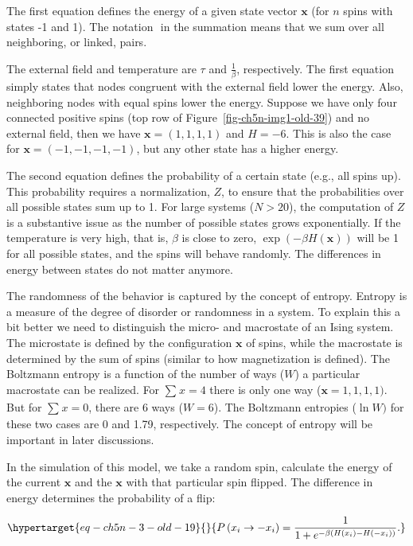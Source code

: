 \documentclass[
  a4paper,
  DIV=11,
  numbers=noendperiod]{scrreprt}
\begin{document}
The first equation defines the energy of a given state vector
\(\mathbf{x}\) (for \(n\) spins with states -1 and 1). The notation
\(< i,j >\) in the summation means that we sum over all neighboring, or
linked, pairs.

The external field and temperature are \(\tau\) and \(\frac{1}{\beta}\),
respectively. The first equation simply states that nodes congruent with
the external field lower the energy. Also, neighboring nodes with equal
spins lower the energy. Suppose we have only four connected positive
spins (top row of Figure~\ref{fig-ch5n-img1-old-39}) and no external
field, then we have \(\mathbf{x} = (1,1,1,1)\) and \(H = - 6\). This is
also the case for \(\mathbf{x} = ( - 1, - 1, - 1, - 1)\), but any other
state has a higher energy.

The second equation defines the probability of a certain state (e.g.,
all spins up). This probability requires a normalization, \(Z\), to
ensure that the probabilities over all possible states sum up to 1. For
large systems (\(N > 20\)), the computation of \(Z\) is a substantive
issue as the number of possible states grows exponentially. If the
temperature is very high, that is, \(\beta\) is close to zero,
\(\exp\left( - \beta H\left( \mathbf{x} \right) \right)\) will be 1 for
all possible states, and the spins will behave randomly. The differences
in energy between states do not matter anymore.

The randomness of the behavior is captured by the concept of entropy.
Entropy is a measure of the degree of disorder or randomness in a
system. To explain this a bit better we need to distinguish the micro-
and macrostate of an Ising system. The microstate is defined by the
configuration \(\mathbf{x}\) of spins, while the macrostate is
determined by the sum of spins (similar to how magnetization is
defined). The Boltzmann entropy is a function of the number of ways
(\(W\)) a particular macrostate can be realized. For \(\sum_{}^{}x = 4\)
there is only one way (\(\mathbf{x} = 1,1,1,1)\). But for
\(\sum_{}^{}x = 0\), there are 6 ways (\(W = 6\)). The Boltzmann
entropies (\(\ln W)\) for these two cases are 0 and 1.79, respectively.
The concept of entropy will be important in later discussions.

In the simulation of this model, we take a random spin, calculate the
energy of the current \(\mathbf{x}\) and the \(\mathbf{x}\) with that
particular spin flipped. The difference in energy determines the
probability of a flip:

\begin{equation}\protect\hypertarget{eq-ch5n-3-old-19}{}{
P\left( x_{i} \rightarrow - x_{i} \right) = \frac{1}{ 1 + e^{- \beta\left( H\left( x_{i} \right) - H\left( - x_{i} \right) \right)}}.}\label{eq-ch5n-3-old-19}\end{equation}
\end{document}
